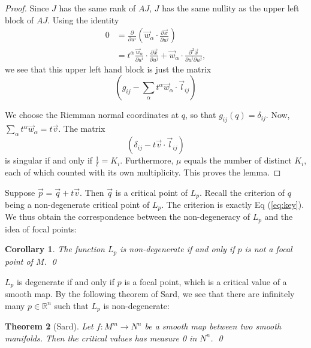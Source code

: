 \documentclass[a4paper,11pt,reqno]{amsart}
\newtheorem{thm}{Theorem}[section]
\newtheorem{cor}[thm]{Corollary}
\newcommand{\RR}{\mathbb{R}}      %
\newcommand{\vect}[1]{\vec{#1}}
\begin{document}
\begin{proof}
  Since $J$ has the same rank of $AJ$, $J$ has the same nullity as the upper
  left block of $AJ$. Using the identity
  \begin{equation}
    \begin{aligned}
      0 &= \frac{\partial}{\partial u^i}\left(\vect{w}_{\alpha} \cdot
        \frac{\partial
          \vect{x}}{\partial u^j}\right) \\
      &= t^{\alpha}\frac{\vect{w}_{\alpha}}{\partial u^i} \cdot \frac{\partial
        \vect{x}}{\partial u^j} + \vect{w}_{\alpha} \cdot \frac{\partial^2
        \vect{x}}{\partial u^i \partial u^j},
    \end{aligned}
  \end{equation}
  we see that this upper left hand block is just the matrix 
  \begin{equation}
    \left( g_{ij} - \sum_{\alpha}t^{\alpha}\vect{w}_{\alpha} \cdot \vect{l}_{ij} \right)
  \end{equation}

  We choose the Riemman normal coordinates at $q$, so that $g_{ij}(q) =
  \delta_{ij}$. Now, $\sum_{\alpha}t^{\alpha}\vect{w}_{\alpha} = t\vect{v}$. The
  matrix
  \begin{equation}
    \label{eq:key}
    \left(
      \delta_{ij}-t\vect{v} \cdot  \vect{l}_{ij}
    \right)
  \end{equation}
  is singular if and only if $\frac{1}{t} = K_i$. Furthermore, $\mu$ equals the
  number of distinct $K_i$, each of which counted with its own
  multiplicity. This proves the lemma.
\end{proof}

Suppose $\vect{p} = \vect{q}+t\vect{v}$. Then $\vect{q}$ is a critical point of
$L_p$. Recall the criterion of $q$ being a non-degenerate critical point of
$L_p$. The criterion is exactly Eq (\ref{eq:key}). We thus obtain the
correspondence between the non-degeneracy of $L_p$ and the idea of focal points:

\begin{cor}
  The function $L_p$ is non-degenerate if and only if $p$ is not a focal point
  of $M$. \qed
\end{cor}

$L_p$ is degenerate if and only if $p$ is a focal point, which is a critical
value of a smooth map. By the following theorem of Sard, we see that there are
infinitely many $p \in \RR^n$ such that $L_p$ is non-degenerate:

\begin{thm}[Sard]
  Let $f: M^m \to N^n$ be a smooth map between two smooth manifolds. Then the
  critical values has measure 0 in $N^n$. \qed
\end{thm}
\end{document}
